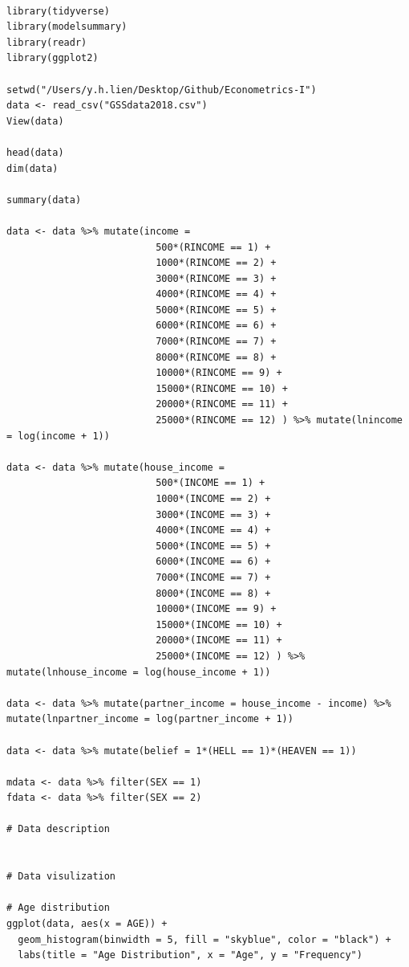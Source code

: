 \documentclass{article}[13pt]
\begin{document}
\begin{verbatim}

library(tidyverse)
library(modelsummary)
library(readr)
library(ggplot2)

setwd("/Users/y.h.lien/Desktop/Github/Econometrics-I")
data <- read_csv("GSSdata2018.csv")
View(data)

head(data)
dim(data)

summary(data)

data <- data %>% mutate(income =
                          500*(RINCOME == 1) + 
                          1000*(RINCOME == 2) + 
                          3000*(RINCOME == 3) + 
                          4000*(RINCOME == 4) + 
                          5000*(RINCOME == 5) + 
                          6000*(RINCOME == 6) + 
                          7000*(RINCOME == 7) + 
                          8000*(RINCOME == 8) + 
                          10000*(RINCOME == 9) + 
                          15000*(RINCOME == 10) +
                          20000*(RINCOME == 11) +  
                          25000*(RINCOME == 12) ) %>% mutate(lnincome = log(income + 1))

data <- data %>% mutate(house_income =
                          500*(INCOME == 1) + 
                          1000*(INCOME == 2) + 
                          3000*(INCOME == 3) + 
                          4000*(INCOME == 4) + 
                          5000*(INCOME == 5) + 
                          6000*(INCOME == 6) + 
                          7000*(INCOME == 7) + 
                          8000*(INCOME == 8) + 
                          10000*(INCOME == 9) + 
                          15000*(INCOME == 10) +
                          20000*(INCOME == 11) +  
                          25000*(INCOME == 12) ) %>% mutate(lnhouse_income = log(house_income + 1))

data <- data %>% mutate(partner_income = house_income - income) %>% mutate(lnpartner_income = log(partner_income + 1))

data <- data %>% mutate(belief = 1*(HELL == 1)*(HEAVEN == 1)) 

mdata <- data %>% filter(SEX == 1)
fdata <- data %>% filter(SEX == 2)

# Data description


# Data visulization

# Age distribution
ggplot(data, aes(x = AGE)) +
  geom_histogram(binwidth = 5, fill = "skyblue", color = "black") +
  labs(title = "Age Distribution", x = "Age", y = "Frequency")


\end{verbatim}
\end{document}
